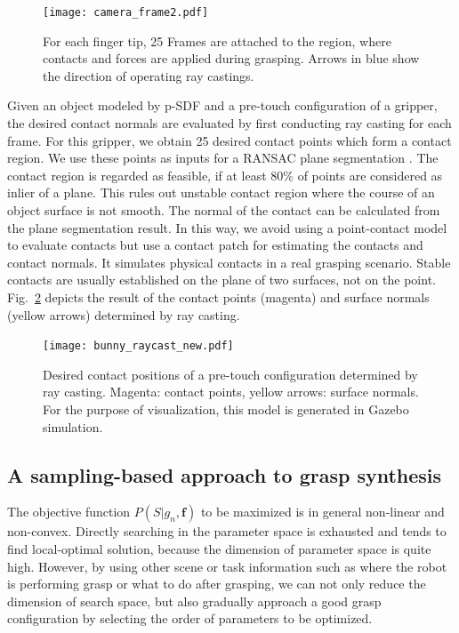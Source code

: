 \begin{figure}[!htbp]
\centering
\texttt{[image: camera\_frame2.pdf]}
\captionsetup{justification=raggedright}
\caption{For each finger tip, 25 Frames are attached to the region, where contacts and forces are applied during grasping. Arrows in blue show the direction of operating ray castings.}
\label{fig:simulated_sensor}       %
\end{figure}   

Given an object modeled by p-SDF and a pre-touch configuration of a gripper, the desired contact normals are evaluated by first conducting ray casting for each frame. For this gripper, we obtain 25 desired contact points which form a contact region.  We use these points as inputs for a RANSAC plane segmentation \cite{Zuliani2008}. The contact region is regarded as feasible, if at least 80\% of points are considered as inlier of a plane. This rules out unstable contact region where the course of an object surface is not smooth. The normal of the contact can be calculated from the plane segmentation result. In this way, we avoid using a point-contact model to evaluate contacts but use a contact patch for estimating the contacts and contact normals. It simulates physical contacts in a real grasping scenario. Stable contacts are usually established on the plane of two surfaces, not on the point.  Fig.~\ref{fig:bunny_raycast} depicts the result of the contact points (magenta) and surface normals (yellow arrows) determined by ray casting.

\begin{figure}[!htbp]
\centering
\texttt{[image: bunny\_raycast\_new.pdf]}
\captionsetup{justification=raggedright}
\caption{Desired contact positions of a pre-touch configuration determined by ray casting. Magenta: contact points, yellow arrows: surface normals. For  the purpose of visualization, this model is generated in Gazebo simulation.}
\label{fig:bunny_raycast}       %
\end{figure} 


\subsection{A sampling-based approach to grasp synthesis}
The objective function $P(S | g_n, \bm{f})$ to be maximized is in general non-linear and non-convex. Directly searching in the parameter space is exhausted and tends to find local-optimal solution, because the dimension of parameter space is quite high. However, by using other scene or task information such as where the robot is performing grasp or what to do after grasping, we can not only reduce the dimension of search space, but also gradually approach a good grasp configuration by selecting the order of parameters to be optimized.   

